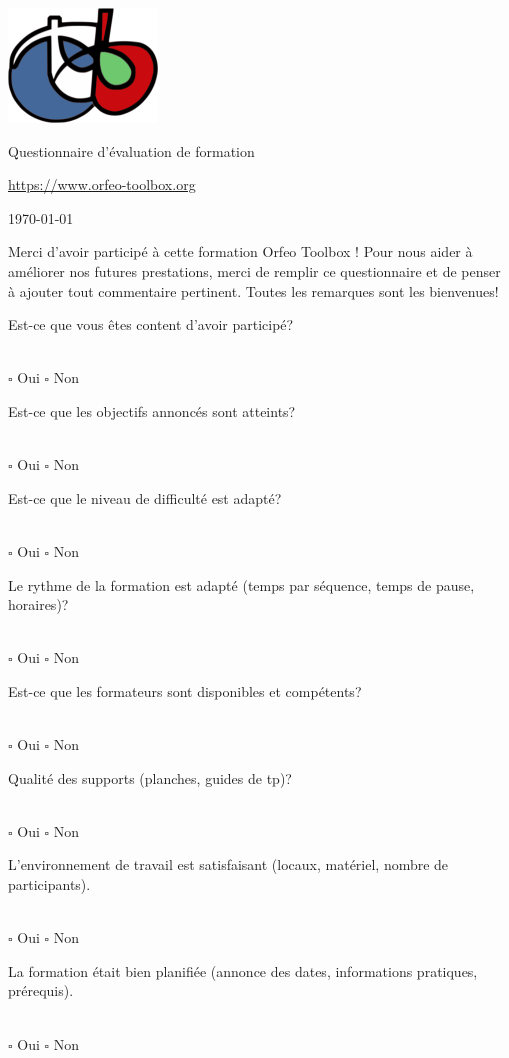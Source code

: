 \documentclass[10pt,a4paper]{article}
\begin{document}
\begin{center}
\includegraphics[scale=0.5]{Art/otb-logo.png}

Questionnaire d'évaluation de formation

{\small\url{https://www.orfeo-toolbox.org}}

\today
\end{center}

\begin{center}
\begin{minipage}{.8\textwidth}
Merci d'avoir participé à cette formation Orfeo Toolbox ! Pour nous aider à
améliorer nos futures prestations, merci de remplir ce questionnaire et de
penser à ajouter tout commentaire pertinent. Toutes les remarques sont les
bienvenues!
\end{minipage}
\end{center}

\newcommand{\answer}{
\\ \quad $\square$ Oui \quad $\square$ Non\\
\vspace{4em}
}

Est-ce que vous êtes content d'avoir participé?
\answer

Est-ce que les objectifs annoncés sont atteints?
\answer

Est-ce que le niveau de difficulté est adapté?
\answer

Le rythme de la formation est adapté (temps par séquence, temps de pause,
horaires)?
\answer

Est-ce que les formateurs sont disponibles et compétents?
\answer

Qualité des supports (planches, guides de tp)?
\answer

L'environnement de travail est satisfaisant (locaux, matériel, nombre de
participants).
\answer

La formation était bien planifiée (annonce des dates, informations pratiques,
prérequis).
\answer

\newcommand{\moduleanswer}{
\\
\begin{tabular}{rlll}  
  Difficulté:         & $\square$ Adaptée & $\square$ Difficile & $\square$
  Facile\\
  Temps alloué:       & $\square$ Adapté  & $\square$ Manque de temps pour tout
  faire & $\square$ Manque de choses à faire\\
  Qualité du support: & $\square$ Bonne & $\square$ À améliorer: & \\
  Commentaire: &&&\\
\end{tabular}
\vspace{4em}
}
\end{document}
